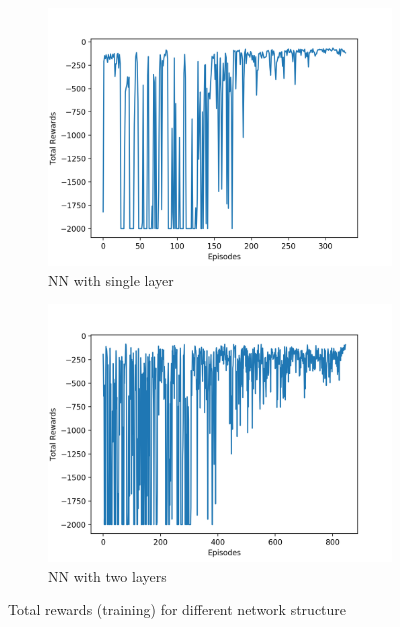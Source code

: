 \documentclass[11pt]{article}
\begin{document}
\begin{figure}[h]
  \begin{subfigure}{0.5\textwidth}
    \centering
    \includegraphics[width=1.0\linewidth]{train_reward_1layer_1.png}
    \caption{NN with single layer}
  \end{subfigure}%
    \begin{subfigure}{0.5\textwidth}
    \centering
    \includegraphics[width=1.0\linewidth]{train_reward_2layers_1.png}
    \caption{NN with two layers}
  \end{subfigure}%
  \caption{Total rewards (training) for different network structure}
\end{figure}
\end{document}
